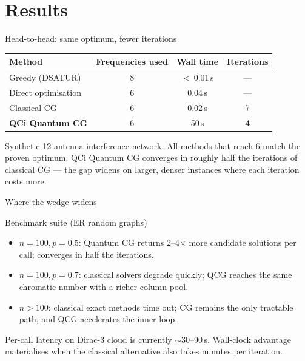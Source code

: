 \documentclass[aspectratio=169,11pt]{beamer}
\begin{document}
\section{Results}

\begin{frame}{Head-to-head: same optimum, fewer iterations}
  \centering
  \renewcommand{\arraystretch}{1.25}
  \begin{tabular}{l c c c}
    \toprule
    \textbf{Method} & \textbf{Frequencies used} & \textbf{Wall time} & \textbf{Iterations}\\
    \midrule
    Greedy (DSATUR)        & 8       & $<\,$0.01\,s & ---\\
    Direct optimisation    & \alert{6}      & 0.04\,s & ---\\
    Classical CG           & \alert{6}       & 0.02\,s & 7\\
    \rowcolor{QCIcol3}
    \textbf{QCi Quantum CG} & \alert{6}      & 50\,s   & \textbf{4}\\
    \bottomrule
  \end{tabular}

  \medskip
  \footnotesize
  Synthetic 12-antenna interference network. All methods that reach $6$
  match the proven optimum. \alert{QCi Quantum CG converges in roughly
  half the iterations} of classical CG --- the gap widens on larger,
  denser instances where each iteration costs more.
\end{frame}

\begin{frame}{Where the wedge widens}
  \begin{block}{Benchmark suite (ER random graphs)}
    \begin{itemize}\small
      \item $n = 100, p = 0.5$: Quantum CG returns 2--4$\times$ more
            candidate solutions per call; converges in
            \alert{half the iterations}.
      \item $n = 100, p = 0.7$: classical solvers degrade quickly; QCG
            reaches the same chromatic number with a richer column pool.
      \item $n > 100$: classical exact methods time out;
            CG remains the only tractable path, and QCG accelerates the
            inner loop.
    \end{itemize}
  \end{block}

  \medskip
  \footnotesize
  Per-call latency on Dirac-3 cloud is currently
  $\sim$30--90\,s. Wall-clock advantage materialises when the classical
  alternative also takes minutes per iteration.
\end{frame}
\end{document}
